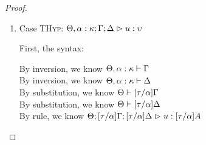 \begin{proof}
\begin{enumerate}
    First, the syntax:
    \begin{tabbedproof}
      \oo By inversion, we know $\judgectx{\Theta, \alpha:\kappa}{\Delta}$ \\
      \oo By inversion, we know $\judgeE[\Theta, \alpha:\kappa]{\Gamma}{e}{A}$ \\
      \oo By substitution, we know $\judgectx{\Theta}{{[\tau/\alpha]}\Delta}$ \\
      \oo By substitution, we know $\judgeE{{[\tau/\alpha]}\Gamma}{{[\tau/\alpha]}e}{{[\tau/\alpha]}A}$ \\
      \oo By rule, we know $\judgeA[\Theta; {[\tau/\alpha]}\Gamma; {[\tau/\alpha]}\Delta]{{[\tau/\alpha]}e}{{[\tau/\alpha]}A}$
    \end{tabbedproof}

    For semantics, consider $\interp{\judgeA[\Theta; {[\tau/\alpha]}\Gamma; {[\tau/\alpha]}\Delta]{{[\tau/\alpha]}e}{{[\tau/\alpha]}A}}\;\theta\;\gamma\;\delta$
    \begin{eqnproof}
            {Semantics}
            {Substitution}
            {Semantics}
    \end{eqnproof}
  The correctness of the application of $\gamma$ and $\delta$ follows from the equations for contexts
  under substitution. 

\item Case \textsc{THyp}: $\judgeA[\Theta, \alpha:\kappa; \Gamma; \Delta]{u}{\upsilon}$

  First, the syntax:
  \begin{tabbedproof}
    \oo By inversion, we know $\judgectx{\Theta, \alpha:\kappa}{\Gamma}$\\
    \oo By inversion, we know $\judgectx{\Theta, \alpha:\kappa}{\Delta}$\\
    \oo By substitution, we know $\judgectx{\Theta}{{[\tau/\alpha]}\Gamma}$\\
    \oo By substitution, we know $\judgectx{\Theta}{{[\tau/\alpha]}\Delta}$\\
    \oo By rule, we know $\judgeA[\Theta; {[\tau/\alpha]}\Gamma; {[\tau/\alpha]}\Delta]{u}{{[\tau/\alpha]}A}$\\
  \end{tabbedproof}


\end{enumerate}
\end{proof}
